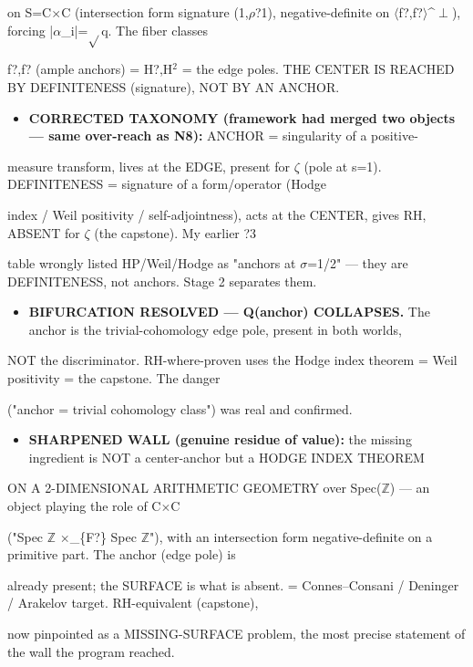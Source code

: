 \documentclass[10pt]{article}
\begin{document}
  on S=C\ensuremath{\times}C (intersection form signature (1,\ensuremath{\rho}?1), negative-definite on \ensuremath{\langle}f?,f?\ensuremath{\rangle}\textasciicircum{}\ensuremath{\perp}), forcing |\ensuremath{\alpha}\_i|=\ensuremath{\sqrt{}}q. The fiber classes\par
  f?,f? (ample anchors) = H?,H\ensuremath{^2} = the edge poles. THE CENTER IS REACHED BY DEFINITENESS (signature), NOT BY AN ANCHOR.\par
\begin{itemize}
\item \textbf{CORRECTED TAXONOMY (framework had merged two objects --- same over-reach as N8):} ANCHOR = singularity of a positive-
\end{itemize}
  measure transform, lives at the EDGE, present for \ensuremath{\zeta} (pole at s=1). DEFINITENESS = signature of a form/operator (Hodge\par
  index / Weil positivity / self-adjointness), acts at the CENTER, gives RH, ABSENT for \ensuremath{\zeta} (the capstone). My earlier ?3\par
  table wrongly listed HP/Weil/Hodge as "anchors at \ensuremath{\sigma}=1/2" --- they are DEFINITENESS, not anchors. Stage 2 separates them.\par
\begin{itemize}
\item \textbf{BIFURCATION RESOLVED --- Q(anchor) COLLAPSES.} The anchor is the trivial-cohomology edge pole, present in both worlds,
\end{itemize}
  NOT the discriminator. RH-where-proven uses the Hodge index theorem = Weil positivity = the capstone. The danger\par
  ("anchor = trivial cohomology class") was real and confirmed.\par
\begin{itemize}
\item \textbf{SHARPENED WALL (genuine residue of value):} the missing ingredient is NOT a center-anchor but a HODGE INDEX THEOREM
\end{itemize}
  ON A 2-DIMENSIONAL ARITHMETIC GEOMETRY over Spec(\ensuremath{\mathbb{Z}}) --- an object playing the role of C\ensuremath{\times}C\par
  ("Spec \ensuremath{\mathbb{Z}} \ensuremath{\times}\_\{F?\} Spec \ensuremath{\mathbb{Z}}"), with an intersection form negative-definite on a primitive part. The anchor (edge pole) is\par
  already present; the SURFACE is what is absent. = Connes--Consani / Deninger / Arakelov target. RH-equivalent (capstone),\par
  now pinpointed as a MISSING-SURFACE problem, the most precise statement of the wall the program reached.\par
\end{document}
